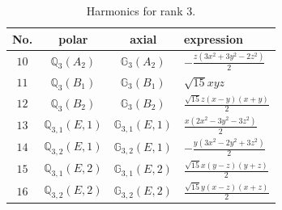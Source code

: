 \documentclass[fleqn,8pt,landscape]{jsarticle}
\begin{document}
\begin{table}[ht!]
\begin{center}
\caption{Harmonics for rank 3.}
\renewcommand{\arraystretch}{1.3}
\begin{tabular}{cccl} \hline \hline
No. & polar & axial & expression \\ \hline
$ 10 $ & $ \mathbb{Q}_{3}(A_{2}) $ & $ \mathbb{G}_{3}(A_{2}) $ & $ - \frac{z \left(3 x^{2} + 3 y^{2} - 2 z^{2}\right)}{2} $ \\
$ 11 $ & $ \mathbb{Q}_{3}(B_{1}) $ & $ \mathbb{G}_{3}(B_{1}) $ & $ \sqrt{15} x y z $ \\
$ 12 $ & $ \mathbb{Q}_{3}(B_{2}) $ & $ \mathbb{G}_{3}(B_{2}) $ & $ \frac{\sqrt{15} z \left(x - y\right) \left(x + y\right)}{2} $ \\
$ 13 $ & $ \mathbb{Q}_{3,1}(E,1) $ & $ \mathbb{G}_{3,1}(E,1) $ & $ \frac{x \left(2 x^{2} - 3 y^{2} - 3 z^{2}\right)}{2} $ \\
$ 14 $ & $ \mathbb{Q}_{3,2}(E,1) $ & $ \mathbb{G}_{3,2}(E,1) $ & $ - \frac{y \left(3 x^{2} - 2 y^{2} + 3 z^{2}\right)}{2} $ \\
$ 15 $ & $ \mathbb{Q}_{3,1}(E,2) $ & $ \mathbb{G}_{3,1}(E,2) $ & $ \frac{\sqrt{15} x \left(y - z\right) \left(y + z\right)}{2} $ \\
$ 16 $ & $ \mathbb{Q}_{3,2}(E,2) $ & $ \mathbb{G}_{3,2}(E,2) $ & $ \frac{\sqrt{15} y \left(x - z\right) \left(x + z\right)}{2} $ \\
 \hline \hline
\end{tabular}
\end{center}
\end{table}
\end{document}
